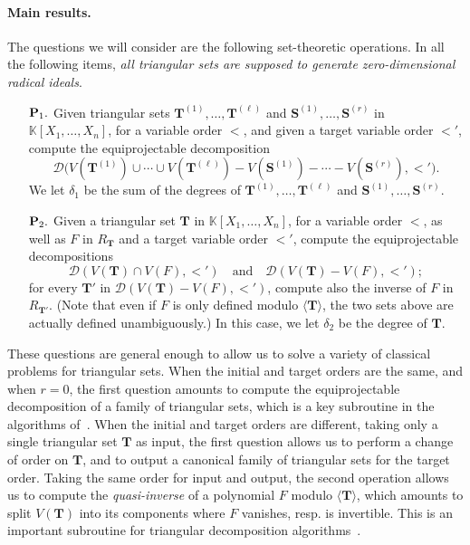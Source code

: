\documentclass[12pt]{article}
\def\K {\ensuremath{\mathbb{K}}}
\def\Tt {\ensuremath{\mathbf{T}}}
\def\Ss {\ensuremath{\mathbf{S}}}
\def\Dr {\ensuremath{\mathscr D}}
\begin{document}
\paragraph{Main results.}
The questions we will consider are the following set-theoretic
operations. In all the following items, {\em all triangular sets are
  supposed to generate zero-dimensional radical ideals}.
\begin{itemize}
\item [${\bf P}_1.$] Given triangular sets
  $\Tt^{(1)},\dots,\Tt^{(\ell)}$ and $\Ss^{(1)},\dots,\Ss^{(r)}$ in
  $\K[X_1,\dots,X_n]$, for a variable order $<$, and given a target
  variable order $<'$, compute the equiprojectable decomposition
  $$\Dr \big (V(\Tt^{(1)}) \cup \cdots \cup V(\Tt^{(\ell)}) -
  V(\Ss^{(1)}) - \cdots - V(\Ss^{(r)}),<'\big).$$ We let
  $\delta_1$ be the sum of the degrees of
  $\Tt^{(1)},\dots,\Tt^{(\ell)}$ and $\Ss^{(1)},\dots,\Ss^{(r)}$.
\item [${\bf P}_2.$] Given a triangular set $\Tt$ in
  $\K[X_1,\dots,X_n]$, for a variable order $<$, as well as $F$ in
  $R_\Tt$ and a target variable order $<'$, compute the
  equiprojectable decompositions
  $$\Dr(V(\Tt)\cap V(F),<') \quad\text{and}\quad \Dr(V(\Tt)-
  V(F),<');$$ for every $\Tt'$ in $\Dr(V(\Tt)- V(F),<')$, compute also the
  inverse of $F$ in $R_{\Tt'}$. (Note that even if $F$ is only defined
  modulo $\langle \Tt \rangle$, the two sets above are actually
  defined unambiguously.)  In this case, we let $\delta_2$ be the
  degree of $\Tt$.
\end{itemize}
These questions are general enough to allow us to solve a variety of
classical problems for triangular sets. When the initial and target
orders are the same, and when $r=0$, the first question amounts to
compute the equiprojectable decomposition of a family of triangular
sets, which is a key subroutine in the algorithms
of~\cite{DaMoScWuXi05}. When the initial and target orders are
different, taking only a single triangular set $\Tt$ as input, the
first question allows us to perform a change of order on $\Tt$, and to
output a canonical family of triangular sets for the target order.
Taking the same order for input and output, the second operation
allows us to compute the {\em quasi-inverse} of a polynomial $F$
modulo $\langle \Tt\rangle$, which amounts to split $V(\Tt)$ into its
components where $F$ vanishes, resp. is invertible.  This is an
important subroutine for triangular decomposition
algorithms~\cite{LiMoPa09}.
\end{document}
